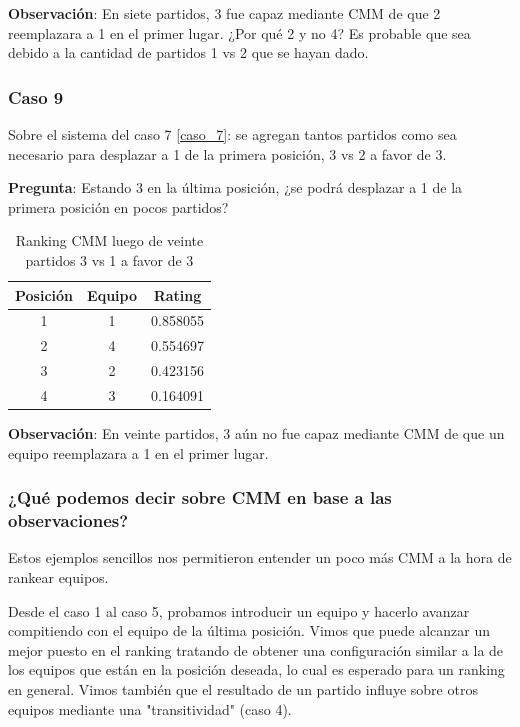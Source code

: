 \textbf{Observación}: En siete partidos, 3 fue capaz mediante CMM de que 2 reemplazara a 1 en el primer lugar. ¿Por qué 2 y no 4? Es probable que sea debido a la cantidad de partidos 1 vs 2 que se hayan dado.

\subsubsection*{Caso 9}\label{caso_9}

Sobre el sistema del caso 7 \ref{caso_7}: se agregan tantos partidos como sea necesario para desplazar a 1 de la primera posición, 3 vs 2 a favor de 3.

\textbf{Pregunta}: Estando 3 en la última posición, ¿se podrá desplazar a 1 de la primera posición en pocos partidos?

\begin{table}[h!]
    \begin{center}
        \begin{tabular}{|c|c|c|}
        \hline
        \textbf{Posición} & \textbf{Equipo} & \textbf{Rating} \\
        \hline
        1 & 1 & 0.858055\\
        2 & 4 & 0.554697\\
        3 & 2 & 0.423156\\
        4 & 3 & 0.164091\\
        \hline
        \end{tabular}
        \caption{Ranking CMM luego de veinte partidos 3 vs 1 a favor de 3}
        \label{cmm_caso_9}
    \end{center}
\end{table}

\textbf{Observación}: En veinte partidos, 3 aún no fue capaz mediante CMM de que un equipo reemplazara a 1 en el primer lugar.

\newpage
\subsubsection{¿Qué podemos decir sobre CMM en base a las observaciones?}

Estos ejemplos sencillos nos permitieron entender un poco más CMM a la hora de rankear equipos.

Desde el caso 1 al caso 5, probamos introducir un equipo y hacerlo avanzar compitiendo con el equipo de la última posición. Vimos que puede alcanzar un mejor puesto en el ranking tratando de obtener una configuración similar a la de los equipos que están en la posición deseada, lo cual es esperado para un ranking en general. Vimos también que el resultado de un partido influye sobre otros equipos mediante una "transitividad" (caso 4).

